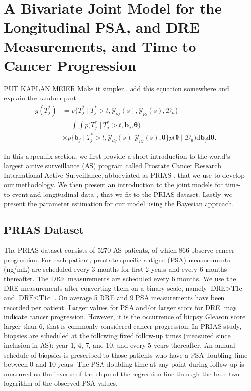 \section{A Bivariate Joint Model for the Longitudinal PSA, and DRE Measurements, and Time to Cancer Progression}
\label{sec:jm_framework}

PUT KAPLAN MEIER
Make it simpler.. add this equation somewhere and explain the random part
\begin{equation*}
\label{eq:post_pred_dist}
\begin{aligned}
g(T^*_j) &= p\big\{T^*_j \mid T^*_j > t, \mathcal{Y}_{dj}(s), \mathcal{Y}_{pj}(s), \mathcal{D}_n\big\}\\
&= \int \int p\big(T^*_j \mid T^*_j > t, \boldsymbol{b}_j, \boldsymbol{\theta}\big)\\
&\times p\big\{\boldsymbol{b}_j \mid T^*_j>t, \mathcal{Y}_{dj}(s), \mathcal{Y}_{pj}(s), \boldsymbol{\theta}\big\}p\big(\boldsymbol{\theta} \mid \mathcal{D}_n\big) \mathrm{d} \boldsymbol{b}_j \mathrm{d} \boldsymbol{\theta}.
\end{aligned}
\end{equation*}

In this appendix section, we first provide a short introduction to the world's largest active surveillance (AS) program called Prostate Cancer Research International Active Surveillance, abbreviated as PRIAS \citep{bul2013active}, that we use to develop our methodology. We then present an introduction to the joint models for time-to-event and longitudinal data \citep{tsiatis2004joint,rizopoulos2012joint}, that we fit to the PRIAS dataset.  Lastly, we present the parameter estimation for our model using the Bayesian approach. 

\subsection{PRIAS Dataset}
The PRIAS dataset consists of 5270 AS patients, of which 866 observe cancer progression. For each patient, prostate-specific antigen (PSA) measurements (ng/mL) are scheduled every 3 months for first 2 years and every 6 months thereafter. The DRE measurements are scheduled every 6 months. We use the DRE measurements after converting them on a binary scale, namely $\mbox{DRE} > \mbox{T1c}$ and $\mbox{DRE} \leq \mbox{T1c}$ \cite{schroder1992tnm}. On average 5 DRE and 9 PSA measurements have been recorded per patient. Larger values for PSA and/or larger score for DRE, may indicate cancer progression. However, it is the occurrence of biopsy Gleason score larger than 6, that is commonly considered cancer progression. In PRIAS study, biopsies are scheduled at the  following fixed follow-up times (measured since inclusion in AS): year 1, 4, 7, and 10, and every 5 years thereafter. An annual schedule of biopsies is prescribed to those patients who have a PSA doubling time between 0 and 10 years. The PSA doubling time at any point during follow-up is measured as the inverse of the slope of the regression line through the base two logarithm of the observed PSA values.

